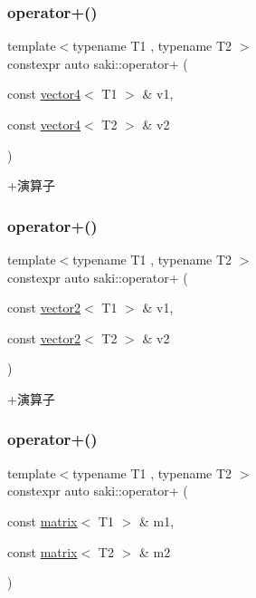 \subsubsection{\texorpdfstring{operator+()}{operator+()}\hspace{0.1cm}{\footnotesize\ttfamily [3/5]}}
{\footnotesize\ttfamily template$<$typename T1 , typename T2 $>$ \\
constexpr auto saki\+::operator+ (\begin{DoxyParamCaption}\item[{const \mbox{\hyperlink{classsaki_1_1vector4}{vector4}}$<$ T1 $>$ \&}]{v1,  }\item[{const \mbox{\hyperlink{classsaki_1_1vector4}{vector4}}$<$ T2 $>$ \&}]{v2 }\end{DoxyParamCaption})}



+演算子 

\mbox{\label{namespacesaki_a7c132b30fc5554123e166c29a5292607}} 
\subsubsection{\texorpdfstring{operator+()}{operator+()}\hspace{0.1cm}{\footnotesize\ttfamily [4/5]}}
{\footnotesize\ttfamily template$<$typename T1 , typename T2 $>$ \\
constexpr auto saki\+::operator+ (\begin{DoxyParamCaption}\item[{const \mbox{\hyperlink{classsaki_1_1vector2}{vector2}}$<$ T1 $>$ \&}]{v1,  }\item[{const \mbox{\hyperlink{classsaki_1_1vector2}{vector2}}$<$ T2 $>$ \&}]{v2 }\end{DoxyParamCaption})}



+演算子 

\mbox{\label{namespacesaki_a10eb3090250dfcb43dd1c7579b6b473c}} 
\subsubsection{\texorpdfstring{operator+()}{operator+()}\hspace{0.1cm}{\footnotesize\ttfamily [5/5]}}
{\footnotesize\ttfamily template$<$typename T1 , typename T2 $>$ \\
constexpr auto saki\+::operator+ (\begin{DoxyParamCaption}\item[{const \mbox{\hyperlink{classsaki_1_1matrix}{matrix}}$<$ T1 $>$ \&}]{m1,  }\item[{const \mbox{\hyperlink{classsaki_1_1matrix}{matrix}}$<$ T2 $>$ \&}]{m2 }\end{DoxyParamCaption})}




